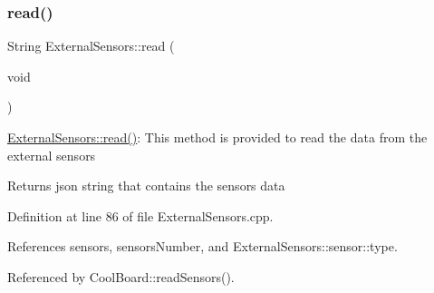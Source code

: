 \subsubsection{\texorpdfstring{read()}{read()}}
{\footnotesize\ttfamily String External\+Sensors\+::read (\begin{DoxyParamCaption}\item[{void}]{ }\end{DoxyParamCaption})}

\hyperlink{classExternalSensors_a53177b81eca3be89508b5511ddcd00fc}{External\+Sensors\+::read()}\+: This method is provided to read the data from the external sensors

\begin{DoxyReturn}{Returns}
json string that contains the sensors data 
\end{DoxyReturn}


Definition at line 86 of file External\+Sensors.\+cpp.



References sensors, sensors\+Number, and External\+Sensors\+::sensor\+::type.



Referenced by Cool\+Board\+::read\+Sensors().


